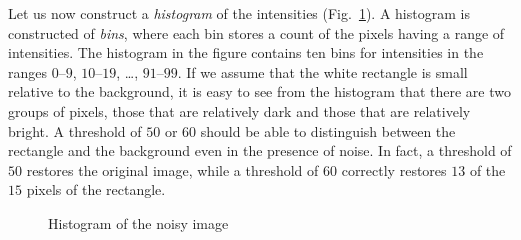 
Let us now construct a \emph{histogram} of the intensities (Fig.~\ref{fig.hist}). A histogram is constructed of \emph{bins}, where each bin stores a count of the pixels having a range of intensities. The histogram in the figure contains ten bins for intensities in the ranges $0$--$9$, $10$--$19$, \ldots, $91$--$99$. If we assume that the white rectangle is small relative to the background, it is easy to see from the histogram that there are two groups of pixels, those that are relatively dark and those that are relatively bright. A threshold of $50$ or $60$ should be able to distinguish between the rectangle and the background even in the presence of noise. In fact, a threshold of $50$ restores the original image, while a threshold of $60$ correctly restores $13$ of the $15$ pixels of the rectangle.

\begin{figure}
\begin{center}
\caption{Histogram of the noisy image}\label{fig.hist}
\end{center}
\end{figure}

